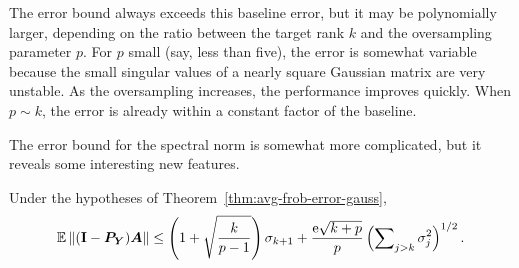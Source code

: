 \documentclass[final]{siamltex}
\newcounter{algorithm}[section]
\begin{document}
The error bound always exceeds this baseline error,
but it may be polynomially larger, depending on the ratio between the
target rank $k$ and the oversampling parameter $p$.  For $p$ small
(say, less than five), the error is somewhat variable because
the small singular values of a nearly square Gaussian matrix are very
unstable.  As the oversampling increases, the performance improves quickly.
When $p \sim k$, the error is already within a constant factor of the baseline.






The error bound for the spectral norm is somewhat more
complicated, but it reveals some interesting new features.

\lsp

\begin{theorem} \label{thm:avg-spec-error-gauss}
Under the hypotheses of Theorem~\ref{thm:avg-frob-error-gauss},
$$
\operatorname{\mathbb{E}} \left\Vert {(\mathbf{I}- \bm{P}_{\bm{Y}}) \bm{A}} \right\Vert
    \leq \left(1 + \sqrt{\frac{k}{p-1}} \right) \sigma_{k+1}
        + \frac{\mathrm{e}\sqrt{k+p}}{p}
        \left(\sum\nolimits_{j>k} \sigma_{j}^2 \right)^{1/2}.
$$
\end{theorem}
\end{document}
